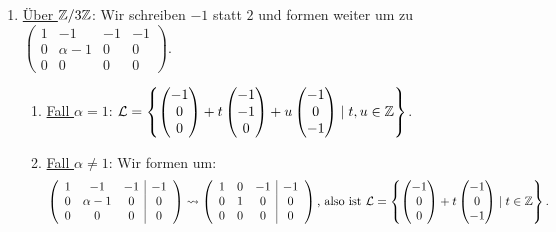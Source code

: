 \begin{enumerate}
	 \item \underline{Über \( \mathbb{Z}/3\mathbb{Z} \)}: Wir schreiben \( -1 \) statt \( 2 \) und formen weiter um zu \( \left( \begin{array}{ccc|c}
	 	1 & -1 & -1 & -1 \\
	 	0 & \alpha-1 & 0 & 0 \\
	 	0 & 0 & 0 & 0
	 \end{array} \right) \).
	 \begin{enumerate}
	 	\item \underline{Fall \( \alpha = 1 \)}: \( \mathcal{L} = \left\{ \begin{pmatrix}
	 		-1 \\ 0 \\ 0
	 	\end{pmatrix} + t \begin{pmatrix}
	 		-1 \\ -1  \\ 0
	 	\end{pmatrix} + u \begin{pmatrix}
	 		-1 \\ 0 \\ -1
	 	\end{pmatrix} \mid t,u \in \mathbb{Z} \right\} \).

	 	\item \underline{Fall \( \alpha \neq 1 \)}: Wir formen um:
	 	\begin{equation*}
	 		\left( \begin{array}{ccc|c}
	 		1 & -1 & -1 & -1 \\
	 		0 & \alpha-1 & 0 & 0 \\
	 		0 & 0 & 0 & 0
	 	\end{array} \right) \leadsto \left( \begin{array}{ccc|c}
	 		1 & 0 & -1 & -1 \\
	 		0 & 1 & 0 & 0 \\
	 		0 & 0 & 0 & 0
	 	\end{array} \right)\text{, also ist } \mathcal{L} = \left\{ \begin{pmatrix}
	 		-1 \\ 0 \\ 0 
	 	\end{pmatrix} +t \begin{pmatrix}
	 		-1 \\ 0 \\ -1
	 	\end{pmatrix} \mid t \in \mathbb{Z} \right\}\text{.}
	 	\end{equation*}
	 \end{enumerate}
\end{enumerate}

